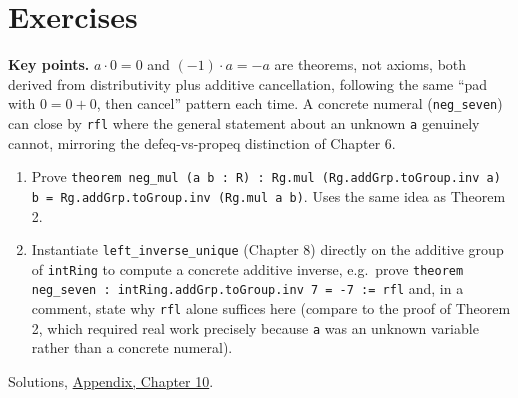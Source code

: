 \section{Exercises}\label{sec:10-ring-theorems:04-exercises:1}

\textbf{Key points.} \(a\cdot 0=0\) and \((-1)\cdot a=-a\) are theorems, not axioms, both derived from distributivity plus additive cancellation, following the same ``pad with \(0=0+0\), then cancel'' pattern each time. A concrete numeral (\texttt{neg\_\allowbreak{}seven}) can close by \texttt{rfl} where the general statement about an unknown \texttt{a} genuinely cannot, mirroring the defeq-vs-propeq distinction of Chapter 6.

\begin{enumerate}
\def\labelenumi{\arabic{enumi}.}
\tightlist
\item
  Prove \texttt{theorem neg\_\allowbreak{}mul (a b : R) : Rg.mul (Rg.addGrp.toGroup.inv a) b = Rg.addGrp.toGroup.inv (Rg.mul a b)}. Uses the same idea as Theorem 2.
\item
  Instantiate \texttt{left\_\allowbreak{}inverse\_\allowbreak{}unique} (Chapter 8) directly on the additive group of \texttt{intRing} to compute a concrete additive inverse, e.g.~prove \texttt{theorem neg\_\allowbreak{}seven : intRing.addGrp.toGroup.inv 7 = -\allowbreak{}7 := rfl} and, in a comment, state why \texttt{rfl} alone suffices here (compare to the proof of Theorem 2, which required real work precisely because \texttt{a} was an unknown variable rather than a concrete numeral).
\end{enumerate}

Solutions, \hyperref[sec:15-appendix-solutions:10-chapter-10:1]{Appendix, Chapter 10}.

